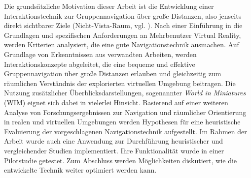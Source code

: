 Die grundsätzliche Motivation dieser Arbeit ist die Entwicklung einer Interaktionstechnik zur Gruppennavigation über große Distanzen, also jenseits direkt sichtbarer Ziele (Nicht-Vista-Raum, vgl. \cite{montello1993scale}). Nach einer Einführung in die Grundlagen und spezifischen Anforderungen an Mehrbenutzer Virtual Reality, werden Kriterien analysiert, die eine gute Navigationstechnik ausmachen.
Auf Grundlage von Erkenntnissen aus verwandten Arbeiten, werden Interaktionskonzepte abgeleitet, die eine bequeme und effektive Gruppennavigation über große Distanzen erlauben und gleichzeitig zum räumlichen Verständnis der explorierten virtuellen Umgebung beitragen.
Die Nutzung zusätzlicher Überblicksdarstellungen, sogenannter \textit{World in Miniatures} (WIM) eignet sich dabei in vielerlei Hinsicht.
Basierend auf einer weiteren Analyse von Forschungsergebnissen zur Navigation und räumlicher Orientierung in realen und virtuellen Umgebungen werden Hypothesen für eine heuristische Evaluierung der vorgeschlagenen Navigationstechnik aufgestellt. Im Rahmen der Arbeit wurde auch eine Anwendung zur Durchführung heuristischer und vergleichender Studien implementiert. Ihre Funktionalität wurde in einer Pilotstudie getestet. Zum Abschluss werden Möglichkeiten diskutiert, wie die entwickelte Technik weiter optimiert werden kann.
